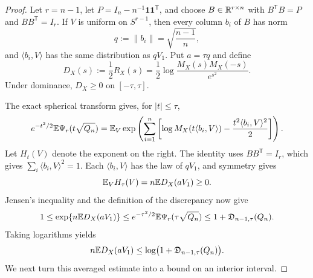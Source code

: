 \begin{proof}
Let $r=n-1$, let $P=I_n-n^{-1}\mathbf1\mathbf1^{\mathsf T}$, and choose $B\in\mathbb R^{r\times n}$ with $B^{\mathsf T}B=P$ and $BB^{\mathsf T}=I_r$. If $V$ is uniform on $S^{r-1}$, then every column $b_i$ of $B$ has norm
\[
q:=\|b_i\|=\sqrt{\frac{n-1}{n}},
\]
and $\langle b_i,V\rangle$ has the same distribution as $qV_1$. Put $a=\tau q$ and define
\[
D_X(s):=\frac12R_X(s)
 =\frac12\log\frac{M_X(s)M_X(-s)}{e^{s^2}}.
\]
Under dominance, $D_X\ge0$ on $[-\tau,\tau]$.

The exact spherical transform gives, for $|t|\le\tau$,
\begin{equation}\label{eq:spherical-discrepancy-identity}
e^{-t^2/2}\mathbb E\Psi_r(t\sqrt{Q_n})
=\mathbb E_V\exp\left(\sum_{i=1}^n\left[\log M_X(t\langle b_i,V\rangle)-\frac{t^2\langle b_i,V\rangle^2}{2}\right]\right).
\end{equation}
Let $H_t(V)$ denote the exponent on the right. The identity uses $BB^{\mathsf T}=I_r$, which gives $\sum_i\langle b_i,V\rangle^2=1$. Each $\langle b_i,V\rangle$ has the law of $qV_1$, and symmetry gives
\[
\mathbb E_V H_\tau(V)=n\mathbb E D_X(aV_1)\ge0.
\]
Jensen's inequality and the definition of the discrepancy now give
\[
1\le\exp\{n\mathbb E D_X(aV_1)\}
\le e^{-\tau^2/2}\mathbb E\Psi_r(\tau\sqrt{Q_n})
\le1+\mathfrak D_{n-1,\tau}(Q_n).
\]
Taking logarithms yields
\begin{equation}\label{eq:integrated-D}
n\mathbb E D_X(aV_1)\le\log\bigl(1+\mathfrak D_{n-1,\tau}(Q_n)\bigr).
\end{equation}
We next turn this averaged estimate into a bound on an interior interval.


\end{proof}
